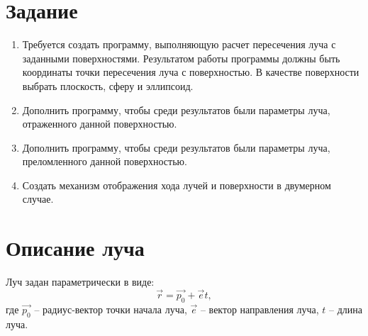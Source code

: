 
\setcounter{page}{2}



\section*{Задание}
{
	\begin{enumerate}
	    \item Требуется создать программу, выполняющую расчет пересечения луча с заданными поверхностями. Результатом работы программы должны быть координаты точки пересечения луча с поверхностью. В качестве поверхности выбрать плоскость, сферу и эллипсоид.
	    
        \item Дополнить программу, чтобы среди результатов были параметры луча, отраженного данной поверхностью.
        
        \item Дополнить программу, чтобы среди результатов были параметры луча, преломленного данной поверхностью.
        
        \item Создать механизм отображения хода лучей и поверхности в двумерном случае.
	\end{enumerate}
}
\newpage

\titleformat{\section}{\large\bfseries}{\thesection}{0.5em}{}
\titlespacing*{\section}{\parindent}{1ex}{1em}

\section{Описание луча}
{
	Луч задан параметрически в виде:
	\begin{equation}\label{ray_eq}
	\vec{r} = \vec{p_0} + \vec{e} t,
	\end{equation}
	где $\vec{p_0}$ -- радиус-вектор точки начала луча, 
	\newline $\vec{e}$ -- вектор направления луча, 
	\newline $t$ -- длина луча.
}

